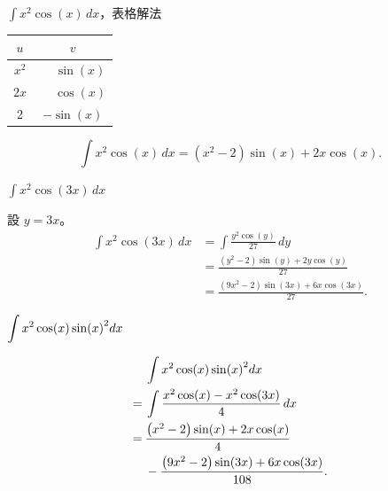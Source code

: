 \documentclass{beamer}
\newcommand{\Left} {\mathopen{}\mathclose\bgroup\left}
\newcommand{\Right}{\aftergroup\egroup\right}
\theoremstyle{remark}
\begin{document}
\begin{frame}{$\displaystyle \int x^2 \cos(x)\,dx$，表格解法}
  \begin{solution}
    \begin{center}
      \begin{tabular}{cc}
	$u$  & $v$\\
	\hline
	$x^2$& $\phantom+\sin(x)$\\
	$2x$ & $\phantom+\cos(x)$\\
	2    & $        -\sin(x)$
      \end{tabular}
    \end{center}
    \[\int x^2 \cos(x)\,dx = \left( x^2 - 2 \right) \sin(x) + 2x \cos(x).\]
  \end{solution}
\end{frame}

\begin{frame}{$\displaystyle \int x^2 \cos(3x)\,dx$}
  \begin{solution}
    設 $y = 3x$。
    \begin{align*}
      \int x^2 \cos(3x)\,dx &= \int \frac{y^2 \cos(y)}{27}\,dy\\
	&= \frac{\left( y^2 - 2 \right) \sin(y) + 2y \cos(y)}{27}\\
	&= \frac{\left( 9x^2 - 2 \right) \sin(3x) + 6x \cos(3x)}{27}.
    \end{align*}
  \end{solution}
\end{frame}

\begin{frame}{$\displaystyle \int x^2 \cos(x) \sin \Left( x \Right)^2 dx$}
  \begin{solution}
    \begin{align*}
	 & \int x^2 \cos(x) \sin \Left( x \Right)^2 dx\\
      =\:& \int \frac{x^2 \cos(x) - x^2 \cos(3x)}{4}\,dx\\
      =\:& \frac{\left( x^2 - 2 \right) \sin(x) + 2x \cos(x)}{4}\\
      \phantom=\:& -\frac{\left( 9x^2 - 2 \right) \sin(3x) + 6x \cos(3x)}{108}.
    \end{align*}
  \end{solution}
\end{frame}
\end{document}
